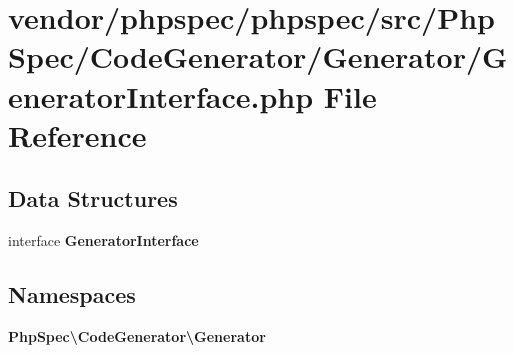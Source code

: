 \section{vendor/phpspec/phpspec/src/\+Php\+Spec/\+Code\+Generator/\+Generator/\+Generator\+Interface.php File Reference}
\label{_generator_interface_8php}
\subsection*{Data Structures}
\begin{DoxyCompactItemize}
\item 
interface {\bf Generator\+Interface}
\end{DoxyCompactItemize}
\subsection*{Namespaces}
\begin{DoxyCompactItemize}
\item 
 {\bf Php\+Spec\textbackslash{}\+Code\+Generator\textbackslash{}\+Generator}
\end{DoxyCompactItemize}
